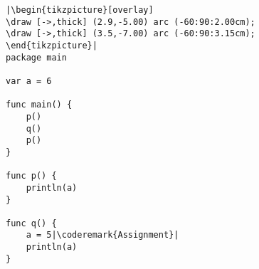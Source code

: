 \begin{lstlisting}[caption=Global scope,label=src:scope2]
|\begin{tikzpicture}[overlay]
\draw [->,thick] (2.9,-5.00) arc (-60:90:2.00cm);
\draw [->,thick] (3.5,-7.00) arc (-60:90:3.15cm);
\end{tikzpicture}|
package main

var a = 6

func main() {
    p()
    q()
    p()
}

func p() {
    println(a)
}

func q() {
    a = 5|\coderemark{Assignment}|
    println(a)
}
\end{lstlisting}
